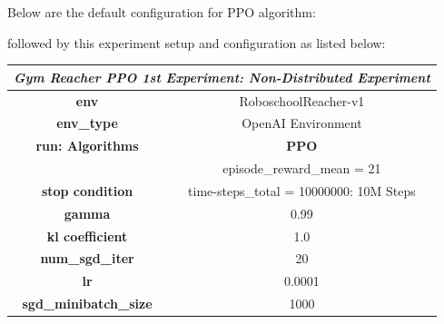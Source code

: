 Below are the default configuration for PPO algorithm:


followed by this experiment setup and configuration as listed below:
\begin{table}[!htb]
    \centering
    \begin{tabular}{|c|l|l|c|l|l|}
    \hline
    \multicolumn{6}{|c|}{\textit{\textbf{Gym Reacher PPO 1st Experiment: Non-Distributed Experiment}}}                                                        \\ \hline
    \multicolumn{3}{|c|}{\textbf{env}}                                  & \multicolumn{3}{c|}{RoboschoolReacher-v1}                                           \\ \hline
    \multicolumn{3}{|c|}{\textbf{env\_type}}                            & \multicolumn{3}{c|}{OpenAI Environment}                                             \\ \hline
    \multicolumn{3}{|c|}{\textbf{run: Algorithms}}                      & \multicolumn{3}{c|}{\cellcolor[HTML]{C0C0C0}\textbf{PPO}}                           \\ \hline
    \multicolumn{3}{|c|}{}                                              & \multicolumn{3}{c|}{\cellcolor[HTML]{E1F7E1}episode\_reward\_mean = 21}             \\ \cline{4-6} 
    \multicolumn{3}{|c|}{\multirow{-2}{*}{\textbf{stop condition}}}     & \multicolumn{3}{c|}{\cellcolor[HTML]{E1F7E1}time-steps\_total = 10000000: 10M Steps} \\ \hline
    \multicolumn{3}{|c|}{\textbf{gamma}}                                & \multicolumn{3}{c|}{0.99}                                                           \\ \hline
    \multicolumn{3}{|c|}{\textbf{kl coefficient}}                            & \multicolumn{3}{c|}{1.0}                                                            \\ \hline
    \multicolumn{3}{|c|}{\textbf{num\_sgd\_iter}}                       & \multicolumn{3}{c|}{20}                                                             \\ \hline
    \multicolumn{3}{|c|}{\textbf{lr}}                                   & \multicolumn{3}{c|}{0.0001}                                                         \\ \hline
    \multicolumn{3}{|c|}{\textbf{sgd\_minibatch\_size}}                 & \multicolumn{3}{c|}{1000}                                                           \\ \hline

\end{tabular}
\end{table}
